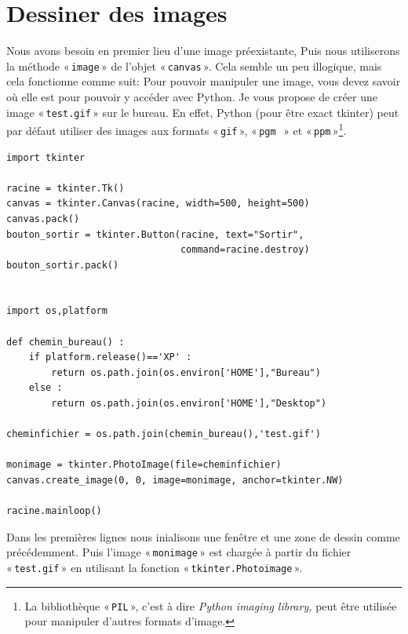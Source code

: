 \section{Dessiner des images}
\label{sec:dessinimages}

Nous avons besoin en premier lieu d'une image préexistante, Puis nous utiliserons la méthode « \texttt{image} » de l'objet « \texttt{canvas} ». Cela semble un peu illogique, mais cela fonctionne comme suit: 
Pour pouvoir manipuler une image, vous devez savoir où elle est pour pouvoir y accéder avec Python. Je vous propose de créer une image « \texttt{test.gif} » sur le bureau. En effet, Python (pour être exact tkinter) peut par défaut utiliser des images aux formats « \texttt{gif} », « \texttt{pgm } » et « \texttt{ppm} »\footnote{La bibliothèque « \texttt{PIL} », c'est à dire \emph{Python imaging library,} peut être utilisée pour manipuler d'autres formats d'image.}.



\begin{Verbatim}[frame=single,rulecolor=\color{mbleu}, label=à taper]
import tkinter

racine = tkinter.Tk()
canvas = tkinter.Canvas(racine, width=500, height=500)
canvas.pack()
bouton_sortir = tkinter.Button(racine, text="Sortir",
                               command=racine.destroy)
bouton_sortir.pack()


import os,platform

def chemin_bureau() :
    if platform.release()=='XP' :
        return os.path.join(os.environ['HOME'],"Bureau")
    else :
        return os.path.join(os.environ['HOME'],"Desktop")
    
cheminfichier = os.path.join(chemin_bureau(),'test.gif')

monimage = tkinter.PhotoImage(file=cheminfichier)
canvas.create_image(0, 0, image=monimage, anchor=tkinter.NW)

racine.mainloop()
\end{Verbatim}

Dans les premières lignes nous inialisons une fenêtre et une zone de dessin comme précédemment.
Puis l'image « \texttt{monimage} » est chargée à partir du fichier « \texttt{test.gif} » en utilisant la fonction « \texttt{tkinter.Photoimage} ».

